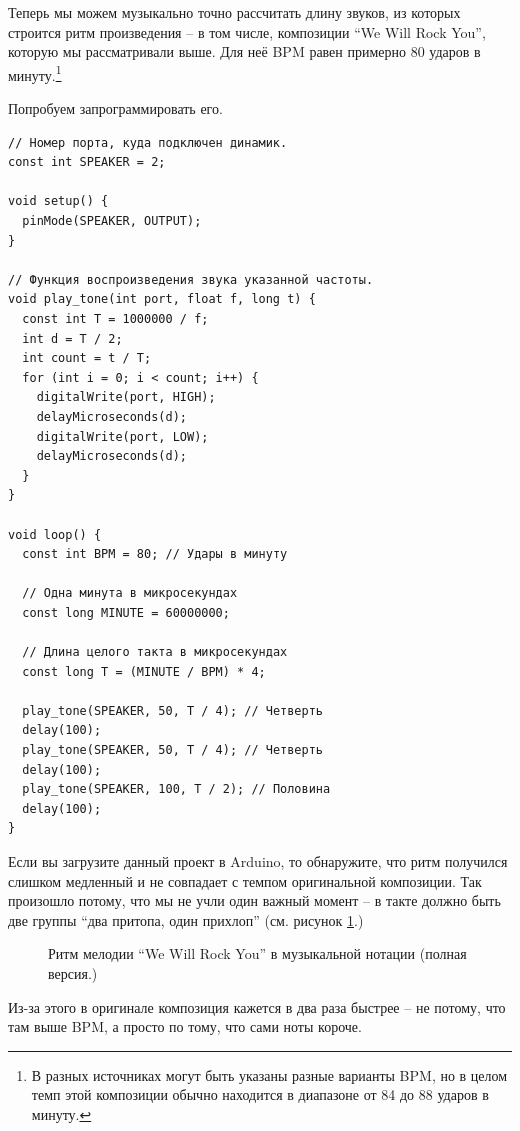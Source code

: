 \documentclass[a4paper,twoside]{book}
\begin{document}
Теперь мы можем музыкально точно рассчитать длину звуков, из которых строится
ритм произведения -- в том числе, композиции ``We Will Rock You'', которую мы
рассматривали выше. Для неё BPM равен примерно 80 ударов в минуту.\footnote{В
разных источниках могут быть указаны разные варианты BPM, но в целом темп этой
композиции обычно находится в диапазоне от 84 до 88 ударов в минуту.}

Попробуем запрограммировать его.

\begin{verbatim}
// Номер порта, куда подключен динамик.
const int SPEAKER = 2;

void setup() {
  pinMode(SPEAKER, OUTPUT);
}

// Функция воспроизведения звука указанной частоты.
void play_tone(int port, float f, long t) {
  const int T = 1000000 / f;
  int d = T / 2;
  int count = t / T;
  for (int i = 0; i < count; i++) {
    digitalWrite(port, HIGH);
    delayMicroseconds(d);
    digitalWrite(port, LOW);
    delayMicroseconds(d);
  }
}

void loop() {
  const int BPM = 80; // Удары в минуту

  // Одна минута в микросекундах
  const long MINUTE = 60000000;

  // Длина целого такта в микросекундах
  const long T = (MINUTE / BPM) * 4;

  play_tone(SPEAKER, 50, T / 4); // Четверть
  delay(100);
  play_tone(SPEAKER, 50, T / 4); // Четверть
  delay(100);
  play_tone(SPEAKER, 100, T / 2); // Половина
  delay(100);
}
\end{verbatim}

Если вы загрузите данный проект в Arduino, то обнаружите, что ритм получился
слишком медленный и не совпадает с темпом оригинальной композиции. Так произошло
потому, что мы не учли один важный момент -- в такте должно быть две группы ``два
притопа, один прихлоп'' (см. рисунок \ref{fig:lilypond-queen-2}.)

\begin{figure}[ht]
  \caption{Ритм мелодии ``We Will Rock You'' в музыкальной нотации (полная версия.)}
  \centering
  \label{fig:lilypond-queen-2}
\end{figure}

Из-за этого в оригинале композиция кажется в два раза быстрее -- не потому, что
там выше BPM, а просто по тому, что сами ноты короче.
\end{document}
